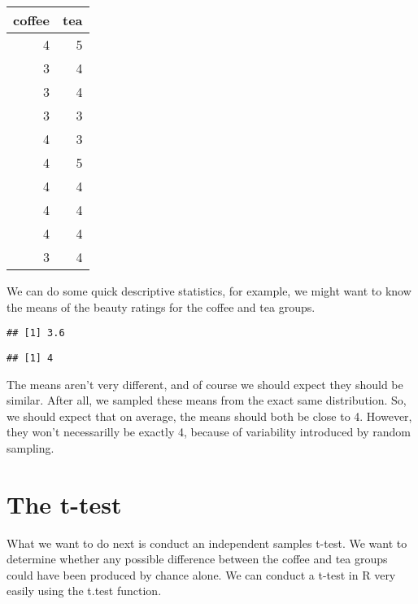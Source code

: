 \begin{tabular}{r|r}
\hline
coffee & tea\\
\hline
4 & 5\\
\hline
3 & 4\\
\hline
3 & 4\\
\hline
3 & 3\\
\hline
4 & 3\\
\hline
4 & 5\\
\hline
4 & 4\\
\hline
4 & 4\\
\hline
4 & 4\\
\hline
3 & 4\\
\hline
\end{tabular}

We can do some quick descriptive statistics, for example, we might want
to know the means of the beauty ratings for the coffee and tea groups.

\begin{Shaded}
\begin{Highlighting}[]
\end{Highlighting}
\end{Shaded}

\begin{verbatim}
## [1] 3.6
\end{verbatim}

\begin{Shaded}
\begin{Highlighting}[]
\end{Highlighting}
\end{Shaded}

\begin{verbatim}
## [1] 4
\end{verbatim}

The means aren't very different, and of course we should expect they
should be similar. After all, we sampled these means from the exact same
distribution. So, we should expect that on average, the means should
both be close to 4. However, they won't necessarilly be exactly 4,
because of variability introduced by random sampling.

\section{The t-test}\label{the-t-test}

What we want to do next is conduct an independent samples t-test. We
want to determine whether any possible difference between the coffee and
tea groups could have been produced by chance alone. We can conduct a
t-test in R very easily using the t.test function.

